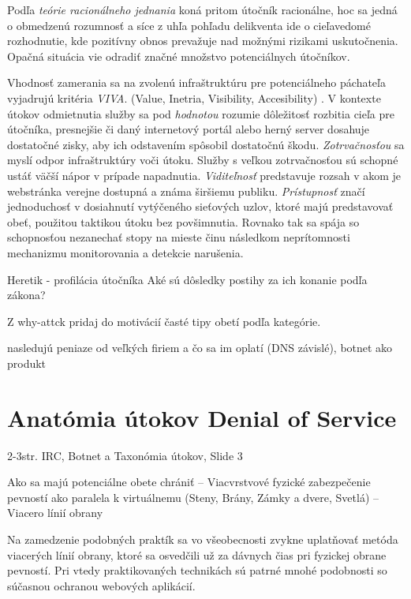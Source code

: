 \documentclass[12pt, a4paper]{article}
\begin{document}
Podľa \emph{teórie racionálneho jednania} koná pritom útočník racionálne, hoc sa jedná o obmedzenú 
rozumnosť a síce z uhľa pohľadu delikventa ide o cieľavedomé rozhodnutie, kde pozitívny obnos prevažuje
nad možnými rizikami uskutočnenia. Opačná situácia vie odradiť značné množstvo potenciálnych útočníkov.

Vhodnosť zamerania sa na zvolenú infraštruktúru pre potenciálneho páchateľa vyjadrujú kritéria \emph{VIVA}.
(Value, Inetria, Visibility, Accesibility) \cite{why-attack}. V kontexte útokov odmietnutia služby sa pod 
\emph{hodnotou} rozumie dôležitosť rozbitia cieľa pre útočníka, presnejšie či daný internetový portál alebo 
herný server dosahuje dostatočné zisky, aby ich odstavením spôsobil dostatočnú škodu. \emph{Zotrvačnosťou} 
sa myslí odpor infraštruktúry voči útoku. Služby s veľkou zotrvačnosťou sú schopné ustáť väčší nápor v 
prípade napadnutia. \emph{Viditeľnosť} predstavuje rozsah v akom je webstránka verejne dostupná a známa 
širšiemu publiku. \emph{Prístupnosť} značí jednoduchosť v dosiahnutí vytýčeného sieťových uzlov, ktoré majú 
predstavovať obeť, použitou taktikou útoku bez povšimnutia. Rovnako tak sa spája so schopnosťou nezanechať 
stopy na mieste činu následkom neprítomnosti mechanizmu monitorovania a detekcie narušenia.


Heretik - profilácia útočníka\cite{heretik}
Aké sú dôsledky postihy za ich konanie podľa zákona?\cite{trestny-zakon}

Z why-attck pridaj do motivácií časté tipy obetí podľa kategórie.\cite{why-attack}

nasledujú peniaze od veľkých firiem a čo sa im oplatí (DNS závislé), botnet ako produkt





\section{Anatómia útokov Denial of Service}
2-3str.
IRC, Botnet a Taxonómia útokov, Slide 3

Ako sa majú potenciálne obete chrániť – Viacvrstvové fyzické zabezpečenie pevností ako paralela k virtuálnemu (Steny, Brány, Zámky a dvere, Svetlá) – Viacero línií obrany

Na zamedzenie 
podobných praktík sa vo všeobecnosti zvykne uplatňovať metóda viacerých línií obrany, ktoré sa osvedčili už 
za dávnych čias pri fyzickej obrane pevností. Pri vtedy praktikovaných technikách sú patrné mnohé podobnosti 
so súčasnou ochranou webových aplikácií.
\end{document}
